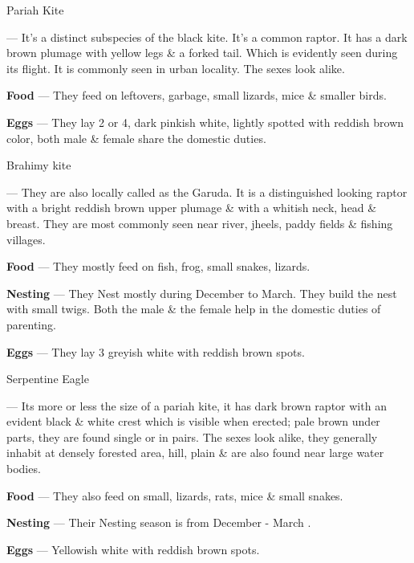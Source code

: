 \begin{bird}{Pariah Kite}

 --- It's a distinct subspecies of the black kite. It's a common raptor. It has a dark brown plumage with yellow legs \& a forked tail. Which is evidently seen during its flight. It is commonly seen in urban locality. The sexes look alike.

{\large\bf Food} --- They feed on leftovers, garbage, small lizards, mice \& smaller birds. 

{\large\bf Eggs} --- They lay 2 or 4, dark pinkish white, lightly spotted with reddish brown color, both male \& female share the domestic duties.
\end{bird}

\begin{bird}{Brahimy kite}

 --- They are also locally called as the Garuda. It is a distinguished looking raptor with a bright reddish brown upper plumage \& with a whitish neck, head \& breast. They  are most commonly seen near river, jheels, paddy fields \& fishing villages.

{\large\bf Food} --- They mostly feed on fish, frog, small snakes, lizards. 

{\large\bf Nesting} --- They Nest mostly during December to March. They build the nest with small twigs. Both  the male \& the female help in the domestic duties of parenting. 

{\large\bf Eggs} --- They lay 3 greyish white with reddish brown spots.
\end{bird}

\newpage

\begin{bird}{Serpentine Eagle}

 --- Its more or less the size of a pariah kite, it has dark brown raptor with an evident black \& white crest which is visible when erected; pale brown under parts, they are found single or in pairs. The sexes look alike, they generally inhabit at densely forested area, hill, plain \& are also found near large water bodies.

{\large\bf Food} --- They also feed on small, lizards, rats, mice \& small snakes. 

{\large\bf Nesting} --- Their Nesting season is from December - March . 

{\large\bf Eggs} --- Yellowish white with reddish brown spots.
\end{bird}

